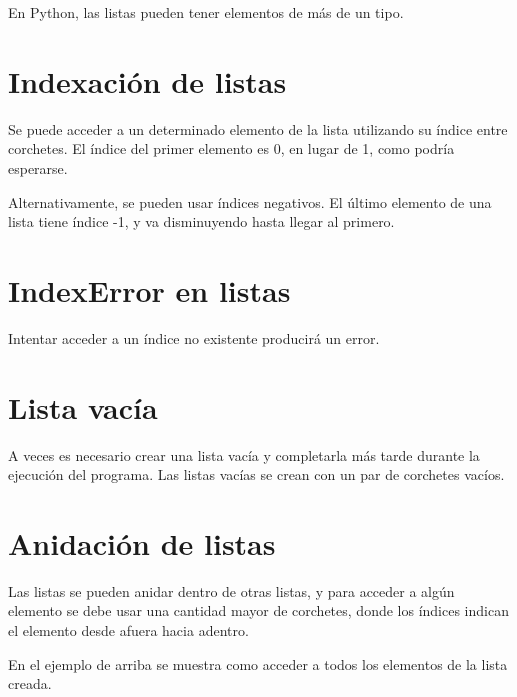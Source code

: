 \documentclass{report}
\begin{document}
En Python, las listas pueden tener elementos de más de un tipo.


\section{Indexación de listas}

Se puede acceder a un determinado elemento de la lista utilizando su índice entre corchetes. El índice del primer elemento es 0, en lugar de 1, como podría esperarse.


Alternativamente, se pueden usar índices negativos. El último elemento de una lista tiene índice -1, y va disminuyendo hasta llegar al primero.


\section{IndexError en listas}

Intentar acceder a un índice no existente producirá un error.


\section{Lista vacía}

A veces es necesario crear una lista vacía y completarla más tarde durante la ejecución del programa. Las listas vacías se crean con un par de corchetes vacíos.


\section{Anidación de listas}

Las listas se pueden anidar dentro de otras listas, y para acceder a algún elemento se debe usar una cantidad mayor de corchetes, donde los índices indican el elemento desde afuera hacia adentro.


En el ejemplo de arriba se muestra como acceder a todos los elementos de la lista creada.
\end{document}
